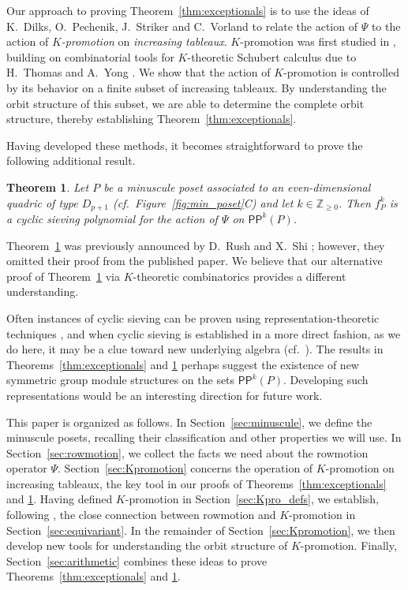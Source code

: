 \documentclass[12pt]{amsart}
\newtheorem{theorem}{Theorem}[section]
\theoremstyle{definition}
\theoremstyle{remark}
\numberwithin{equation}{section}
\newcommand{\pp}{\ensuremath{\mathsf{PP}}}
\begin{document}
Our approach to proving Theorem~\ref{thm:exceptionals} is to use the ideas of K.~Dilks, O.~Pechenik, J.~Striker and C.~Vorland \cite{DPS, Dilks.Striker.Vorland} to relate the action of $\Psi$ to the action of \emph{$K$-promotion} on \emph{increasing tableaux}. $K$-promotion was first studied in \cite{Pechenik}, building on combinatorial tools for $K$-theoretic Schubert calculus due to H.~Thomas and A.~Yong \cite{Thomas.Yong:K}. We show that the action of $K$-promotion is controlled by its behavior on a finite subset of increasing tableaux. By understanding the orbit structure of this subset, we are able to determine the complete orbit structure, thereby establishing Theorem~\ref{thm:exceptionals}.

Having developed these methods, it becomes straightforward to prove the following additional result.
\begin{theorem}\label{thm:propeller}
Let $P$ be a minuscule poset associated to an even-dimensional quadric of type $D_{p+1}$ (cf.~Figure~\ref{fig:min_poset}C) and let $k \in \mathbb{Z}_{\geq 0}$. Then $f_P^k$ is a cyclic sieving polynomial for the action of $\Psi$ on $\pp^k(P)$.
\end{theorem}
Theorem~\ref{thm:propeller} was previously announced by D.~Rush and X.~Shi \cite[Theorem~10.1]{Rush.Shi}; however, they omitted their proof \cite[]{Rush.Shi:report} from the published paper. We believe that our alternative proof of Theorem~\ref{thm:propeller} via $K$-theoretic combinatorics provides a different understanding.

Often instances of cyclic sieving can be proven using representation-theoretic techniques \cite{Reiner.Stanton.White, Rhoades:thesis}, and when cyclic sieving is established in a more direct fashion, as we do here, it may be a clue toward new underlying algebra (cf.\ \cite{Rhoades:skein}). The results in Theorems~\ref{thm:exceptionals} and \ref{thm:propeller} perhaps suggest the existence of new symmetric group module structures on the sets $\pp^k(P)$. Developing such representations would be an interesting direction for future work.

This paper is organized as follows. In Section~\ref{sec:minuscule}, we define the minuscule posets, recalling their classification and other properties we will use. In Section~\ref{sec:rowmotion}, we collect the facts we need about the rowmotion operator $\Psi$. Section~\ref{sec:Kpromotion} concerns the operation of $K$-promotion on increasing tableaux, the key tool in our proofs of Theorems~\ref{thm:exceptionals} and \ref{thm:propeller}. Having defined $K$-promotion in Section~\ref{sec:Kpro_defs}, we establish, following \cite{DPS,Dilks.Striker.Vorland}, the close connection between rowmotion and $K$-promotion in Section~\ref{sec:equivariant}. In the remainder of Section~\ref{sec:Kpromotion}, we then develop new tools for understanding the orbit structure of $K$-promotion.
Finally, Section~\ref{sec:arithmetic} combines these ideas to prove Theorems~\ref{thm:exceptionals} and \ref{thm:propeller}.
\end{document}
